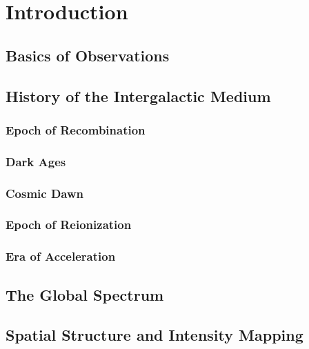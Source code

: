 \chapter{Introduction}\label{Ch:Intro}

\section{Basics of \cm Observations}

\section{History of the Intergalactic Medium}

\subsection{Epoch of Recombination}

\subsection{Dark Ages}

\subsection{Cosmic Dawn}

\subsection{Epoch of Reionization}

\subsection{Era of Acceleration}

\section{The \cm Global Spectrum}

\section{\cm Spatial Structure and Intensity Mapping}

